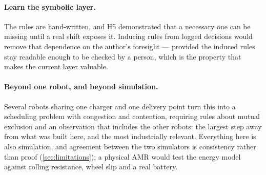 \paragraph{Learn the symbolic layer.}
The rules are hand-written, and H5 demonstrated that a necessary one can be missing until a real
shift exposes it. Inducing rules from logged decisions would remove that dependence on the author's
foresight --- provided the induced rules stay readable enough to be checked by a person, which is
the property that makes the current layer valuable.

\paragraph{Beyond one robot, and beyond simulation.}
Several robots sharing one charger and one delivery point turn this into a scheduling problem with
congestion and contention, requiring rules about mutual exclusion and an observation that includes
the other robots: the largest step away from what was built here, and the most industrially
relevant. Everything here is also simulation, and agreement between the two simulators is
consistency rather than proof (\cref{sec:limitations}); a physical AMR would test the energy model
against rolling resistance, wheel slip and a real battery.
